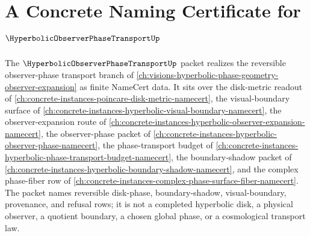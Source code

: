 \chapter{A Concrete Naming Certificate for $\HyperbolicObserverPhaseTransportUp$}
\label{ch:concrete-instances-hyperbolic-observer-phase-transport-namecert}

The $\HyperbolicObserverPhaseTransportUp$ packet realizes the reversible observer-phase transport branch of \autoref{ch:visions-hyperbolic-phase-geometry-observer-expansion} as finite NameCert data. It sits over the disk-metric readout of \autoref{ch:concrete-instances-poincare-disk-metric-namecert}, the visual-boundary surface of \autoref{ch:concrete-instances-hyperbolic-visual-boundary-namecert}, the observer-expansion route of \autoref{ch:concrete-instances-hyperbolic-observer-expansion-namecert}, the observer-phase packet of \autoref{ch:concrete-instances-hyperbolic-observer-phase-namecert}, the phase-transport budget of \autoref{ch:concrete-instances-hyperbolic-phase-transport-budget-namecert}, the boundary-shadow packet of \autoref{ch:concrete-instances-hyperbolic-boundary-shadow-namecert}, and the complex phase-fiber row of \autoref{ch:concrete-instances-complex-phase-surface-fiber-namecert}. The packet names reversible disk-phase, boundary-shadow, visual-boundary, provenance, and refusal rows; it is not a completed hyperbolic disk, a physical observer, a quotient boundary, a chosen global phase, or a cosmological transport law.

